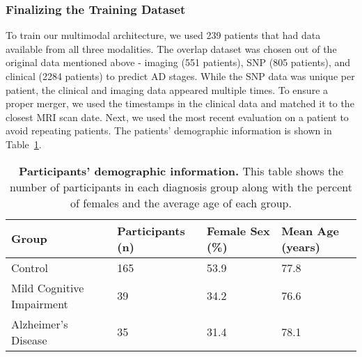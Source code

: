 \documentclass[11pt]{article}
\begin{document}
\subsubsection*{Finalizing the Training Dataset}
To train our multimodal architecture, we used 239 patients that had data available from all three modalities. The overlap dataset was chosen out of the original data mentioned above - imaging (551 patients), SNP (805 patients), and clinical (2284 patients) to predict AD stages. While the SNP data was unique per patient, the clinical and imaging data appeared multiple times. To ensure a proper merger, we used the timestamps in the clinical data and matched it to the closest MRI scan date. Next, we used the most recent evaluation on a patient to avoid repeating patients. The patients' demographic information is shown in Table~\ref{tab:demographic}.


\begin{table}[H]
\centering
\caption{\textbf{Participants' demographic information.} This table shows the number of participants in each diagnosis group along with the percent of females and the average age of each group.}
\begin{tabular}{|l|l|l|l|}
\hline
\textbf{Group}                         & \textbf{Participants (n)} & \textbf{Female Sex (\%)} & \textbf{Mean Age (years)} \\ \hline
Control                       & 165              & 53.9            & 77.8             \\ \hline
Mild Cognitive Impairment & 39               & 34.2            & 76.6             \\ \hline
Alzheimer's Disease           & 35               & 31.4            & 78.1             \\ \hline
\end{tabular}
\label{tab:demographic} 
\end{table}
\end{document}
